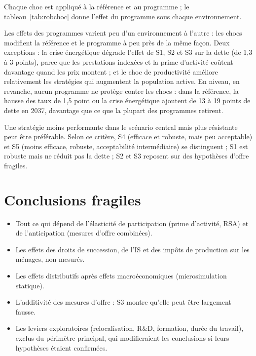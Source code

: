 Chaque choc est appliqué à la référence et au programme ; le tableau~\ref{tab:robchoc} donne l'effet du programme
sous chaque environnement.

\begin{table}[htbp]\centering\scriptsize
\caption{Effet des programmes en 2037 sous différents environnements : dette (haut, points de PIB) et chômage (bas,
points). Pour les programmes v0.6, quatre environnements seulement ont été simulés.}\label{tab:robchoc}
\end{table}

Les effets des programmes varient peu d'un environnement à l'autre : les chocs modifient la référence et le
programme à peu près de la même façon. Deux exceptions : la crise énergétique dégrade l'effet de S1, S2 et S3 sur la
dette (de 1,3 à 3 points), parce que les prestations indexées et la prime d'activité coûtent davantage quand les prix
montent ; et le choc de productivité améliore relativement les stratégies qui augmentent la population active. En
niveau, en revanche, aucun programme ne protège contre les chocs : dans la référence, la hausse des taux de 1,5 point
ou la crise énergétique ajoutent de 13 à 19 points de dette en 2037, davantage que ce que la plupart des programmes
retirent.

\begin{resultat}
Une stratégie moins performante dans le scénario central mais plus résistante peut être préférable. Selon ce critère,
S4 (efficace et robuste, mais peu acceptable) et S5 (moins efficace, robuste, acceptabilité intermédiaire) se
distinguent ; S1 est robuste mais ne réduit pas la dette ; S2 et S3 reposent sur des hypothèses d'offre fragiles.
\end{resultat}

\section{Conclusions fragiles}

\begin{itemize}
\item Tout ce qui dépend de l'élasticité de participation (prime d'activité, RSA) et de l'anticipation (mesures
d'offre combinées).
\item Les effets des droits de succession, de l'IS et des impôts de production sur les ménages, non mesurés.
\item Les effets distributifs après effets macroéconomiques (microsimulation statique).
\item L'additivité des mesures d'offre : S3 montre qu'elle peut être largement fausse.
\item Les leviers exploratoires (relocalisation, R\&D, formation, durée du travail), exclus du périmètre principal,
qui modifieraient les conclusions si leurs hypothèses étaient confirmées.
\end{itemize}
